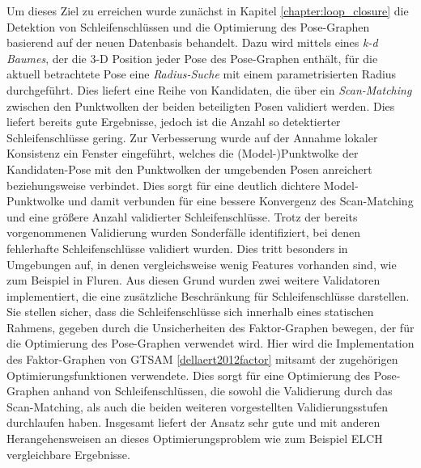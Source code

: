 Um dieses Ziel zu erreichen wurde zunächst in Kapitel \ref{chapter:loop_closure} die Detektion von Schleifenschlüssen und die Optimierung des Pose-Graphen basierend auf der neuen Datenbasis behandelt. Dazu wird mittels eines \emph{k-d Baumes}, der die 3-D Position jeder Pose des Pose-Graphen enthält, für die aktuell betrachtete Pose eine \emph{Radius-Suche} mit einem parametrisierten Radius durchgeführt. Dies liefert eine Reihe von Kandidaten, die über ein \emph{Scan-Matching} zwischen den Punktwolken der beiden beteiligten Posen validiert werden. Dies liefert bereits gute Ergebnisse, jedoch ist die Anzahl so detektierter Schleifenschlüsse gering. Zur Verbesserung wurde auf der Annahme lokaler Konsistenz ein Fenster eingeführt, welches die (Model-)Punktwolke der Kandidaten-Pose mit den Punktwolken der umgebenden Posen anreichert beziehungsweise verbindet. Dies sorgt für eine deutlich dichtere Model-Punktwolke und damit verbunden für eine bessere Konvergenz des Scan-Matching und eine größere Anzahl validierter Schleifenschlüsse. Trotz der bereits vorgenommenen Validierung wurden Sonderfälle identifiziert, bei denen fehlerhafte Schleifenschlüsse validiert wurden. Dies tritt besonders in Umgebungen auf, in denen vergleichsweise wenig Features vorhanden sind, wie zum Beispiel in Fluren. Aus diesen Grund wurden zwei weitere Validatoren implementiert, die eine zusätzliche Beschränkung für Schleifenschlüsse darstellen. Sie stellen sicher, dass die Schleifenschlüsse sich innerhalb eines statischen Rahmens, gegeben durch die Unsicherheiten des Faktor-Graphen bewegen, der für die Optimierung des Pose-Graphen verwendet wird. Hier wird die Implementation des Faktor-Graphen von GTSAM \ref{dellaert2012factor} mitsamt der zugehörigen Optimierungsfunktionen verwendete. Dies sorgt für eine Optimierung des Pose-Graphen anhand von Schleifenschlüssen, die sowohl die Validierung durch das Scan-Matching, als auch die beiden weiteren vorgestellten Validierungsstufen durchlaufen haben. Insgesamt liefert der Ansatz sehr gute und mit anderen Herangehensweisen an dieses Optimierungsproblem wie zum Beispiel ELCH \cite{sprickerhof2011heuristic} vergleichbare Ergebnisse. 

